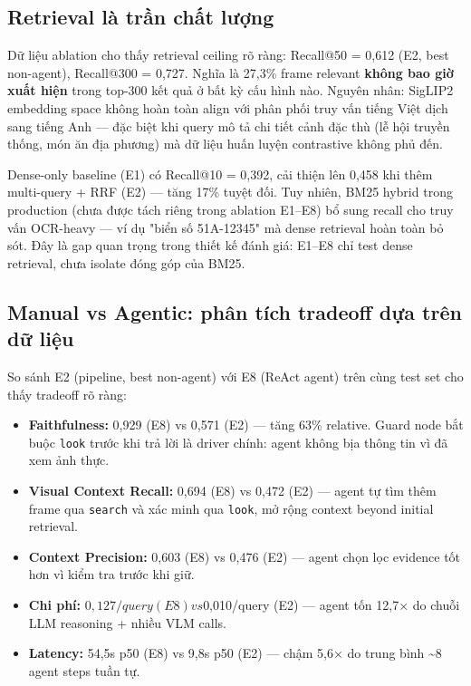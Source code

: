 \documentclass[12pt,a4paper,onecolumn]{article}
\begin{document}
\subsection{Retrieval là trần chất lượng}

Dữ liệu ablation cho thấy retrieval ceiling rõ ràng: Recall@50 = 0,612 (E2, best non-agent), Recall@300 = 0,727. Nghĩa là 27,3\% frame relevant \textbf{không bao giờ xuất hiện} trong top-300 kết quả ở bất kỳ cấu hình nào. Nguyên nhân: SigLIP2 embedding space không hoàn toàn align với phân phối truy vấn tiếng Việt dịch sang tiếng Anh — đặc biệt khi query mô tả chi tiết cảnh đặc thù (lễ hội truyền thống, món ăn địa phương) mà dữ liệu huấn luyện contrastive không phủ đến.

Dense-only baseline (E1) có Recall@10 = 0,392, cải thiện lên 0,458 khi thêm multi-query + RRF (E2) — tăng 17\% tuyệt đối. Tuy nhiên, BM25 hybrid trong production (chưa được tách riêng trong ablation E1–E8) bổ sung recall cho truy vấn OCR-heavy — ví dụ "biển số 51A-12345" mà dense retrieval hoàn toàn bỏ sót. Đây là gap quan trọng trong thiết kế đánh giá: E1–E8 chỉ test dense retrieval, chưa isolate đóng góp của BM25.

\subsection{Manual vs Agentic: phân tích tradeoff dựa trên dữ liệu}

So sánh E2 (pipeline, best non-agent) với E8 (ReAct agent) trên cùng test set cho thấy tradeoff rõ ràng:

\begin{itemize}
  \item \textbf{Faithfulness:} 0,929 (E8) vs 0,571 (E2) — tăng 63\% relative. Guard node bắt buộc \texttt{look} trước khi trả lời là driver chính: agent không bịa thông tin vì đã xem ảnh thực.
  \item \textbf{Visual Context Recall:} 0,694 (E8) vs 0,472 (E2) — agent tự tìm thêm frame qua \texttt{search} và xác minh qua \texttt{look}, mở rộng context beyond initial retrieval.
  \item \textbf{Context Precision:} 0,603 (E8) vs 0,476 (E2) — agent chọn lọc evidence tốt hơn vì kiểm tra trước khi giữ.
  \item \textbf{Chi phí:} $0,127/query (E8) vs $0,010/query (E2) — agent tốn 12,7× do chuỗi LLM reasoning + nhiều VLM calls.
  \item \textbf{Latency:} 54,5s p50 (E8) vs 9,8s p50 (E2) — chậm 5,6× do trung bình \textasciitilde{}8 agent steps tuần tự.
\end{itemize}
\end{document}

